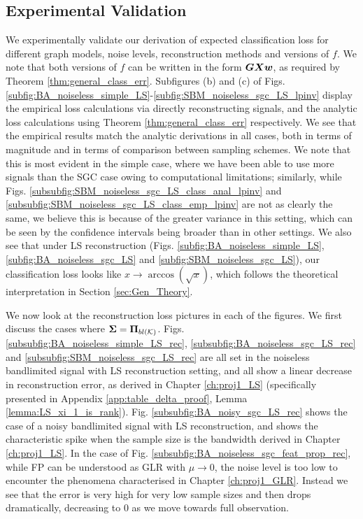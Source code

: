 \subsection{Experimental Validation}
We experimentally validate our derivation of expected classification loss for different graph models, noise levels, reconstruction methods and versions of $f$. We note that both versions of $f$ can be written in the form $\bm{G}\bm{X}\bm{w}$, as required by Theorem \ref{thm:general_class_err}. Subfigures (b) and (c) of Figs. \ref{subfig:BA_noiseless_simple_LS}-\ref{subfig:SBM_noiseless_sgc_LS_lpinv} display the empirical loss calculations via directly reconstructing signals, and the analytic loss calculations using Theorem \ref{thm:general_class_err} respectively. We see that the empirical results match the analytic derivations in all cases, both in terms of magnitude and in terms of comparison between sampling schemes. We note that this is most evident in the simple case, where we have been able to use more signals than the SGC case owing to computational limitations; similarly, while Figs. \ref{subsubfig:SBM_noiseless_sgc_LS_class_anal_lpinv} and \ref{subsubfig:SBM_noiseless_sgc_LS_class_emp_lpinv} are not as clearly the same, we believe this is because of the greater variance in this setting, which can be seen by the confidence intervals being broader than in other settings. We also see that under  LS reconstruction (Figs. \ref{subfig:BA_noiseless_simple_LS}, \ref{subfig:BA_noiseless_sgc_LS} and \ref{subfig:SBM_noiseless_sgc_LS}), our classification loss looks like $x \to \arccos\left(\sqrt{x}\right)$, which follows the theoretical interpretation in Section \ref{sec:Gen_Theory}.

We now look at the reconstruction loss pictures in each of the figures. We first discuss the cases where $\matr{\Sigma} = \projbl$. Figs. \ref{subsubfig:BA_noiseless_simple_LS_rec}, \ref{subsubfig:BA_noiseless_sgc_LS_rec} and \ref{subsubfig:SBM_noiseless_sgc_LS_rec} are all set in the noiseless bandlimited signal with LS reconstruction setting, and all show a linear decrease in reconstruction error, as derived in Chapter \ref{ch:proj1_LS} (specifically presented in Appendix \ref{app:table_delta_proof}, Lemma \ref{lemma:LS_xi_1_is_rank}). Fig. \ref{subsubfig:BA_noisy_sgc_LS_rec} shows the case of a noisy bandlimited signal with LS reconstruction, and shows the characteristic spike when the sample size is the bandwidth derived in Chapter \ref{ch:proj1_LS}. In the case of Fig. \ref{subsubfig:BA_noiseless_sgc_feat_prop_rec}, while FP can be understood as GLR with $\mu \to 0$, the noise level is too low to encounter the phenomena characterised in Chapter \ref{ch:proj1_GLR}. Instead we see that the error is very high for very low sample sizes and then drops dramatically, decreasing to 0 as we move towards full observation.


